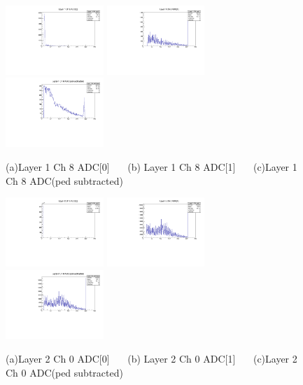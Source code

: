 \documentclass[a4paper,11pt]{article}
\theoremstyle{mytheor}
\begin{document}
\begin{figure}[H] 
\vspace*{-0.3cm} 
\includegraphics[width=0.33\textwidth,scale=0.5,trim=0 0 0 0,clip]{plotsdir/file0_test-Layer1_Ch8_adc0-1.pdf} 
\includegraphics[width=0.33\textwidth,scale=0.5,trim=0 0 0 0,clip]{plotsdir/file0_test-Layer1_Ch8_adc1-1.pdf} 
\includegraphics[width=0.33\textwidth,scale=0.5,trim=0 0 0 0,clip]{plotsdir/file0_test-Layer1_Ch8_adcPedsub-1.pdf} 
\caption{(a)Layer 1 Ch 8 ADC[0] ~~~(b) Layer 1 Ch 8 ADC[1] ~~~(c)Layer 1 Ch 8 ADC(ped subtracted) } 
\end{figure} 
\begin{figure}[H] 
\vspace*{-0.3cm} 
\includegraphics[width=0.33\textwidth,scale=0.5,trim=0 0 0 0,clip]{plotsdir/file0_test-Layer2_Ch0_adc0-1.pdf} 
\includegraphics[width=0.33\textwidth,scale=0.5,trim=0 0 0 0,clip]{plotsdir/file0_test-Layer2_Ch0_adc1-1.pdf} 
\includegraphics[width=0.33\textwidth,scale=0.5,trim=0 0 0 0,clip]{plotsdir/file0_test-Layer2_Ch0_adcPedsub-1.pdf} 
\caption{(a)Layer 2 Ch 0 ADC[0] ~~~(b) Layer 2 Ch 0 ADC[1] ~~~(c)Layer 2 Ch 0 ADC(ped subtracted) } 
\end{figure} 
\end{document}
